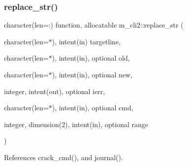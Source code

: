 \mbox{\label{namespacem__cli2_a8f65cf1b227d837d89437368c660666f}} 
\subsubsection{\texorpdfstring{replace\+\_\+str()}{replace\_str()}}
{\footnotesize\ttfamily character(len=\+:) function, allocatable m\+\_\+cli2\+::replace\+\_\+str (\begin{DoxyParamCaption}\item[{character(len=$\ast$), intent(in)}]{targetline,  }\item[{character(len=$\ast$), intent(in), optional}]{old,  }\item[{character(len=$\ast$), intent(in), optional}]{new,  }\item[{integer, intent(out), optional}]{ierr,  }\item[{character(len=$\ast$), intent(in), optional}]{cmd,  }\item[{integer, dimension(2), intent(in), optional}]{range }\end{DoxyParamCaption})\hspace{0.3cm}{\ttfamily [private]}}



References crack\+\_\+cmd(), and journal().

